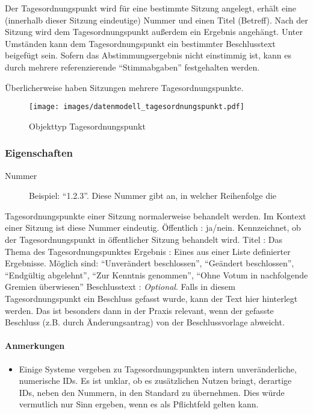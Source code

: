 \documentclass[,a4paper]{article}
\makeatletter
\def\maxwidth{\ifdim\Gin@nat@width>\linewidth\linewidth
\else\Gin@nat@width\fi}
\let\Oldincludegraphics\includegraphics
\renewcommand{\includegraphics}[1]{\Oldincludegraphics[width=\maxwidth]{#1}}
\makeatother
\begin{document}
Der Tagesordnungspunkt wird für eine bestimmte Sitzung angelegt, erhält
eine (innerhalb dieser Sitzung eindeutige) Nummer und einen Titel
(Betreff). Nach der Sitzung wird dem Tagesordnungspunkt außerdem ein
Ergebnis angehängt. Unter Umständen kann dem Tagesordnungspunkt ein
bestimmter Beschlusstext beigefügt sein. Sofern das Abstimmungsergebnis
nicht einstimmig ist, kann es durch mehrere referenzierende
``Stimmabgaben'' festgehalten werden.

Überlicherweise haben Sitzungen mehrere Tagesordnungspunkte.

\begin{figure}[htbp]
\centering
\texttt{[image: images/datenmodell\_tagesordnungspunkt.pdf]}
\caption{Objekttyp Tagesordnungspunkt}
\end{figure}

\subsubsection{Eigenschaften}

\begin{description}
\item[Nummer]
Beispiel: ``1.2.3''. Diese Nummer gibt an, in welcher Reihenfolge die
\end{description}

Tagesordnungspunkte einer Sitzung normalerweise behandelt werden. Im
Kontext einer Sitzung ist diese Nummer eindeutig. Öffentlich : ja/nein.
Kennzeichnet, ob der Tagesordnungspunkt in öffentlicher Sitzung
behandelt wird. Titel : Das Thema des Tagesordnungspunktes Ergebnis :
Eines aus einer Liste definierter Ergebnisse. Möglich sind:
``Unverändert beschlossen'', ``Geändert beschlossen'', ``Endgültig
abgelehnt'', ``Zur Kenntnis genommen'', ``Ohne Votum in nachfolgende
Gremien überwiesen'' Beschlusstext : \emph{Optional}. Falls in diesem
Tagesordnungspunkt ein Beschluss gefasst wurde, kann der Text hier
hinterlegt werden. Das ist besonders dann in der Praxis relevant, wenn
der gefasste Beschluss (z.B. durch Änderungsantrag) von der
Beschlussvorlage abweicht.

\paragraph{Anmerkungen}

\begin{itemize}
\item
  Einige Systeme vergeben zu Tagesordnungspunkten intern
  unveränderliche, numerische IDs. Es ist unklar, ob es zusätzlichen
  Nutzen bringt, derartige IDs, neben den Nummern, in den Standard zu
  übernehmen. Dies würde vermutlich nur Sinn ergeben, wenn es als
  Pflichtfeld gelten kann.
\end{itemize}
\end{document}
